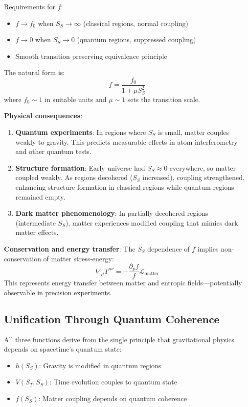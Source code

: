 \documentclass[12pt]{article}
\begin{document}
Requirements for $f$:
\begin{itemize}
    \item $f \to f_0$ when $S_S \to \infty$ (classical regions, normal coupling)
    \item $f \to 0$ when $S_S \to 0$ (quantum regions, suppressed coupling)
    \item Smooth transition preserving equivalence principle
\end{itemize}

The natural form is:
\begin{equation}
    f = \frac{f_0}{1 + \mu S_S^2}
\end{equation}
where $f_0 \sim 1$ in suitable units and $\mu \sim 1$ sets the transition scale.

\textbf{Physical consequences}:
\begin{enumerate}
    \item \textbf{Quantum experiments}: In regions where $S_S$ is small, matter couples weakly to gravity. This predicts measurable effects in atom interferometry and other quantum tests.
    \item \textbf{Structure formation}: Early universe had $S_S \approx 0$ everywhere, so matter coupled weakly. As regions decohered ($S_S$ increased), coupling strengthened, enhancing structure formation in classical regions while quantum regions remained empty.
    \item \textbf{Dark matter phenomenology}: In partially decohered regions (intermediate $S_S$), matter experiences modified coupling that mimics dark matter effects.
\end{enumerate}

\textbf{Conservation and energy transfer}: The $S_S$ dependence of $f$ implies non-conservation of matter stress-energy:
\begin{equation}
    \nabla_\mu T^{\mu\nu} = -\frac{\partial_\nu f}{f} \mathcal{L}_\mathrm{matter}
\end{equation}
This represents energy transfer between matter and entropic fields—potentially observable in precision experiments.

\subsection{Unification Through Quantum Coherence}

All three functions derive from the single principle that gravitational physics depends on spacetime's quantum state:
\begin{itemize}
    \item \textbf{$h(S_S)$}: Gravity is modified in quantum regions
    \item \textbf{$V(S_T, S_S)$}: Time evolution couples to quantum state
    \item \textbf{$f(S_S)$}: Matter coupling depends on quantum coherence
\end{itemize}
\end{document}
